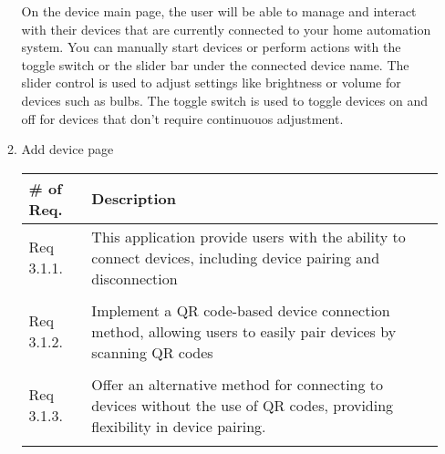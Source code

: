 \begin{enumerate}[label=\arabic*.]
\begin{enumerate}[label*={\arabic*.},ref=\theenumi.\arabic*]
                        On the device main page, the user will be able to manage and interact with their devices that are currently connected to your home automation system. You can manually start devices or perform actions with the toggle switch or the slider bar under the connected device name. The slider control is used to adjust settings like brightness or volume for devices such as bulbs. The toggle switch is used to toggle devices on and off for devices that don't require continuouos adjustment.  \\
              \item Add device page
              \begin{table}[H]
                        \center
                        \begin{tabular}{m{1.4cm} m{5.5cm}}
                            \toprule
                            \# of Req. & Description                                                                                                                   \\
                            \midrule
                            Req 3.1.1.   & This application provide users with the ability to connect devices, including device pairing and disconnection \\\\
                            Req 3.1.2.   & Implement a QR code-based device connection method, allowing users to easily pair devices by scanning QR codes                     \\\\
                            Req 3.1.3.   &Offer an alternative method for connecting to devices without the use of QR codes, providing flexibility in device pairing. \\\\
                            \bottomrule
                        \end{tabular}
                    \end{table}
                

\end{enumerate}
\end{enumerate}
